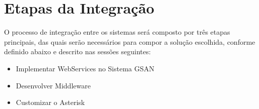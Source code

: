 \section{Etapas da Integração}
O processo de integração entre os sistemas será composto por três etapas principais, das quais serão necessários para compor a solução escolhida, conforme definido abaixo e descrito nas sessões seguintes:

\begin{itemize}
	\item Implementar WebServices no Sistema GSAN 
	\item Desenvolver Middleware
	\item Customizar o Asterisk	
\end{itemize}
